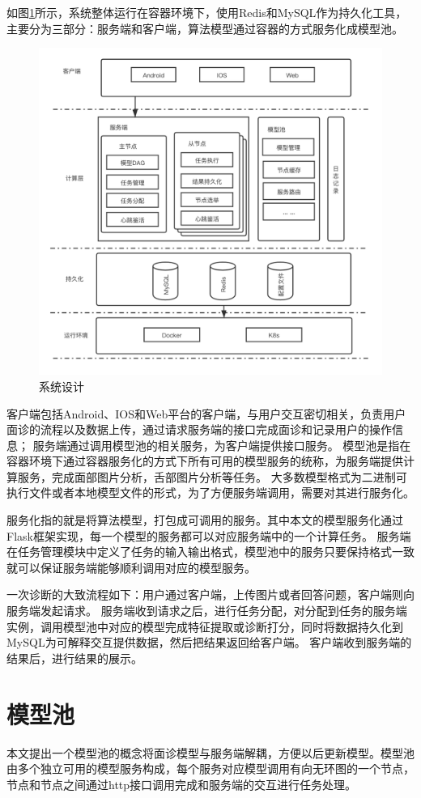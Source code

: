 如图\ref{fig:system}所示，系统整体运行在容器环境下，使用Redis和MySQL作为持久化工具，主要分为三部分：服务端和客户端，算法模型通过容器的方式服务化成模型池。
\begin{figure}
    \centering
    \includegraphics[width=12cm]{images/server3.JPG}
    \caption{系统设计}
    \label{fig:system}
\end{figure}

客户端包括Android、IOS和Web平台的客户端，与用户交互密切相关，负责用户面诊的流程以及数据上传，通过请求服务端的接口完成面诊和记录用户的操作信息；
服务端通过调用模型池的相关服务，为客户端提供接口服务。
模型池是指在容器环境下通过容器服务化的方式下所有可用的模型服务的统称，为服务端提供计算服务，完成面部图片分析，舌部图片分析等任务。
大多数模型格式为二进制可执行文件或者本地模型文件的形式，为了方便服务端调用，需要对其进行服务化。

服务化指的就是将算法模型，打包成可调用的服务。其中本文的模型服务化通过Flask框架实现，每一个模型的服务都可以对应服务端中的一个计算任务。
服务端在任务管理模块中定义了任务的输入输出格式，模型池中的服务只要保持格式一致就可以保证服务端能够顺利调用对应的模型服务。

一次诊断的大致流程如下：用户通过客户端，上传图片或者回答问题，客户端则向服务端发起请求。
服务端收到请求之后，进行任务分配，对分配到任务的服务端实例，调用模型池中对应的模型完成特征提取或诊断打分，同时将数据持久化到MySQL为可解释交互提供数据，然后把结果返回给客户端。
客户端收到服务端的结果后，进行结果的展示。

\section{模型池}
本文提出一个模型池的概念将面诊模型与服务端解耦，方便以后更新模型。模型池由多个独立可用的模型服务构成，每个服务对应模型调用有向无环图的一个节点，节点和节点之间通过http接口调用完成和服务端的交互进行任务处理。

